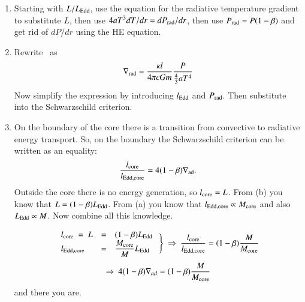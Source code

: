\documentclass[11pt,a4paper]{report}
\begin{document}
\begin{enumerate}
\begin{enumerate}

  \item

    Starting with $L/L_{\rm Edd}$, use the equation for the radiative
    temperature gradient to substitute $L$, then use $4 a T^3 dT/dr =
    dP_{\rm rad}/dr$, then use $P_{\rm rad} = P(1-\beta)$ and get rid
    of $dP/dr$ using the HE equation.


\item 

  Rewrite \gradrad\ as
  \[
  \nabla_{\rm rad} = \frac{\kappa l}{4 \pi c G m}
  \frac{P}{\frac{4}{3}a T^4 }
  \]
  Now simplify the expression by introducing $l_{\rm Edd}$ and $P_{\rm
    rad}$. Then substitute into the Schwarz\-schild criterion.


\item On the boundary of the core there is a transition from
  convective to radiative energy transport. So, on the boundary the
  Schwarzschild criterion can be written as an equality:
  \[
  \frac{l_\mathrm{core}}{l_{\rm Edd, core}} = 4 (1-\beta)\nabla_{\rm
    ad}.
  \]
  Outside the core there is no energy generation, so $l_{\rm core}
  = L$. From (b) you know that $L = (1-\beta) L_{\rm Edd}$.  From (a)
  you know that $l_{\rm Edd, core} \propto M_{\rm core}$ and also
  $L_{\rm Edd} \propto M$. Now combine all this knowledge.

  \[
  \begin{array}{lcl}
    l_{\rm core} ~ = ~ L &=& (1-\beta)L_{\rm Edd} \\
    l_{\rm Edd, core} &=& \displaystyle\frac{M_{\rm core}}{M} L_{\rm Edd} \\
  \end{array} ~ \Bigg\} ~
  \Rightarrow ~ \displaystyle
  \frac{l_{\rm core}}{l_{\rm Edd, core}} = (1-\beta)\frac{M}{M_{\rm
      core}}
  \]
  \[
  \Rightarrow ~ 4(1-\beta)\nabla_{ad} =
  (1-\beta)\frac{M}{M_{\rm core}}
  \]
  and there you are.


    

\end{enumerate}

\end{enumerate}
\end{document}
